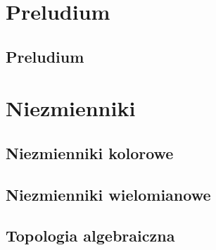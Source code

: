 \documentclass{LegrandOrangeBook}
\begin{document}
\pagestyle{empty} %






\tableofcontents

\pagestyle{fancy} %
\cleardoublepage %

\chapterspaceabove{5.75cm} %
\chapterspacebelow{7.25cm} %

\part{Preludium}
\chapter{Preludium}







\part{Niezmienniki}
\chapter{Niezmienniki kolorowe}





\chapter{Niezmienniki wielomianowe}








\chapter{Topologia algebraiczna}





\end{document}
